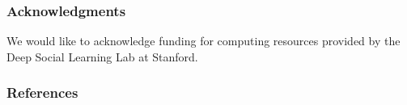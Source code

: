 \documentclass{article} %
\begin{document}





\subsubsection*{Acknowledgments}

We would like to acknowledge funding for computing resources provided by the Deep Social Learning Lab at Stanford.

\subsubsection*{References} %
\end{document}
